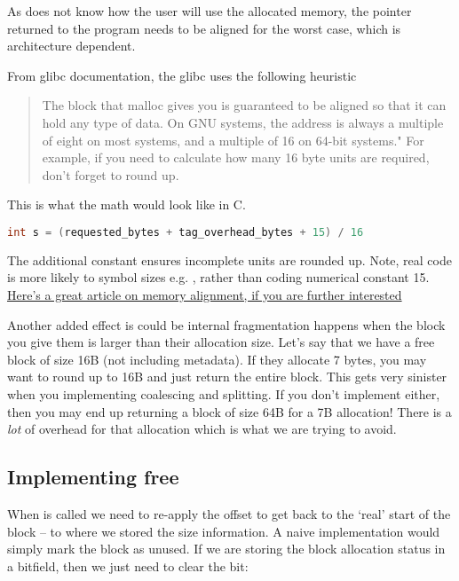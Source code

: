 As  does not know how the user will use the allocated memory, the pointer returned to the program needs to be aligned for the worst case, which is architecture dependent.

From glibc documentation, the glibc  uses the following heuristic \cite{vma_paging}
\begin{quote}
The block that malloc gives you is guaranteed to be aligned so that it can hold any type of data. On GNU systems, the address is always a multiple of eight on most systems, and a multiple of 16 on 64-bit systems." For example, if you need to calculate how many 16 byte units are required, don't forget to round up.
\end{quote}

This is what the math would look like in C.

\begin{lstlisting}[language=C]
int s = (requested_bytes + tag_overhead_bytes + 15) / 16
\end{lstlisting}

The additional constant ensures incomplete units are rounded up. Note, real code is more likely to symbol sizes e.g. , rather than coding numerical constant 15.
\href{http://www.ibm.com/developerworks/library/pa-dalign/}{Here's a great article on memory alignment, if you are further interested}

Another added effect is could be internal fragmentation happens when the block you give them is larger than their allocation size.
Let's say that we have a free block of size 16B (not including metadata).
If they allocate 7 bytes, you may want to round up to 16B and just return the entire block.
This gets very sinister when you implementing coalescing and splitting.
If you don't implement either, then you may end up returning a block of size 64B for a 7B allocation!
There is a \emph{lot} of overhead for that allocation which is what we are trying to avoid.

\subsection{Implementing free}

When  is called we need to re-apply the offset to get back to the `real' start of the block -- to where we stored the size information.
A naive implementation would simply mark the block as unused.
If we are storing the block allocation status in a bitfield, then we just need to clear the bit:

